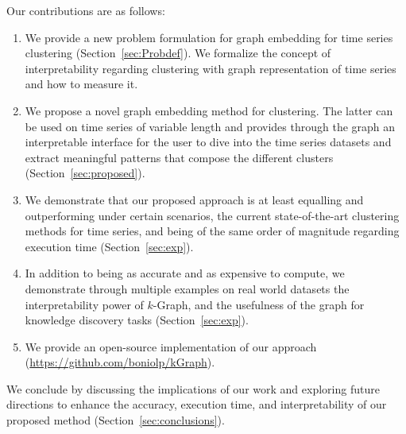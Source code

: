 Our contributions are as follows:
\begin{enumerate}
    \item We provide a new problem formulation for graph embedding for time series clustering (Section~\ref{sec:Probdef}). We formalize the concept of interpretability regarding clustering with graph representation of time series and how to measure it.
    \item We propose a novel graph embedding method for  clustering. The latter can be used on time series of variable length and provides through the graph an interpretable interface for the user to dive into the time series datasets and extract meaningful patterns that compose the different clusters (Section~\ref{sec:proposed}).
    \item We demonstrate that our proposed approach is at least equalling and outperforming under certain scenarios, the current state-of-the-art clustering methods for time series, and being of the same order of magnitude regarding execution time (Section~\ref{sec:exp}).
    \item In addition to being as accurate and as expensive to compute, we demonstrate through multiple examples on real world datasets the interpretability power of $k$-Graph, and the usefulness of the graph for knowledge discovery tasks (Section~\ref{sec:exp}).
    \item We provide an open-source implementation of our approach (\url{https://github.com/boniolp/kGraph}). 
\end{enumerate}

We conclude by discussing the implications of our work and exploring future directions to enhance the accuracy, execution time, and interpretability of our proposed method (Section~\ref{sec:conclusions}). 
